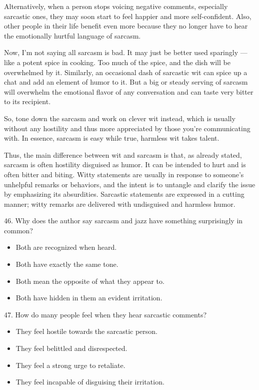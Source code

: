 \documentclass[UTF8,11pt]{ctexart}
\begin{document}
Alternatively, when a person stops voicing negative comments, especially sarcastic ones, they may soon start to feel happier and more self-confident. Also, other people in their life benefit even more because they no longer have to hear the emotionally hurtful language of sarcasm.


Now, I’m not saying all sarcasm is bad. It may just be better used sparingly — like a potent spice in cooking. Too much of the spice, and the dish will be overwhelmed by it. Similarly, an occasional dash of sarcastic wit can spice up a chat and add an element of humor to it. But a big or steady serving of sarcasm will overwhelm the emotional flavor of any conversation and can taste very bitter to its recipient.


So, tone down the sarcasm and work on clever wit instead, which is usually without any hostility and thus more appreciated by those you’re communicating with. In essence, sarcasm is easy while true, harmless wit takes talent.


Thus, the main difference between wit and sarcasm is that, as already stated, sarcasm is often hostility disguised as humor. It can be intended to hurt and is often bitter and biting. Witty statements are usually in response to someone’s unhelpful remarks or behaviors, and the intent is to untangle and clarify the issue by emphasizing its absurdities. Sarcastic statements are expressed in a cutting manner; witty remarks are delivered with undisguised and harmless humor.


46. Why does the author say sarcasm and jazz have something surprisingly in common?


\begin{itemize}[leftmargin=2em,itemsep=.2em,topsep=.4em]\item[A.] Both are recognized when heard.
\item[B.] Both have exactly the same tone.
\item[C.] Both mean the opposite of what they appear to.
\item[D.] Both have hidden in them an evident irritation.
\end{itemize}

47. How do many people feel when they hear sarcastic comments?


\begin{itemize}[leftmargin=2em,itemsep=.2em,topsep=.4em]\item[A.] They feel hostile towards the sarcastic person.
\item[B.] They feel belittled and disrespected.
\item[C.] They feel a strong urge to retaliate.
\item[D.] They feel incapable of disguising their irritation.
\end{itemize}
\end{document}
